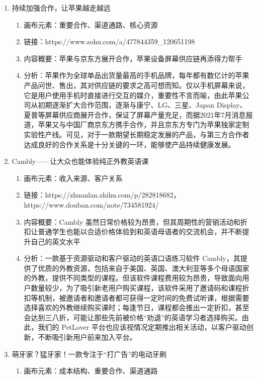 \documentclass[a4paper]{ctexart}
\begin{document}
\begin{enumerate}[label=\alph*.]
\begin{enumerate}[label=\alph*.]
  \end{enumerate}
  \item 持续加强合作，让苹果越走越远
  \begin{enumerate}[label=\alph*.]
    \item 画布元素：重要合作、渠道通路、核心资源
    \item 链接：https://www.sohu.com/a/477844359\_120651198
    \item 内容概要：苹果与京东方展开合作，苹果设备屏幕供应链再添得力帮手
    \item 分析：苹果作为全球单品出货量最高的手机品牌，每年都有数亿计的苹果产品问世、售出，其对供应链的要求之高可想而知。仅以手机屏幕来说，它是用户使用手机时直接进行交互的媒介，重要性不言而喻，由此苹果公司从初期逐渐扩大合作范围，逐渐与康宁、LG、三星、Japan Display、夏普等屏幕供应商展开合作，保证了屏幕产量充足，而据2021年7月消息报道，苹果又与中国厂商京东方携手合作，并且京东方专门为苹果独家定制实验性产线。可见，对于一款期望长期稳定发展的产品，与第三方合作者达成良好的合作关系是十分关键的一环，能够使产品持续健康发展。
  \end{enumerate}
  \item Cambly——让大众也能体验纯正外教英语课
  \begin{enumerate}[label=\alph*.]
    \item 画布元素：收入来源、客户关系
    \item 链接：https://zhuanlan.zhihu.com/p/282818682，https://www.douban.com/note/734581924/
    \item 内容概要：Cambly 虽然日常价格较为昂贵，但其周期性的营销活动和折扣让普通学生也能以合适价格体验到和英语母语者的交流机会，并不断提升自己的英文水平
    \item 分析：一款基于资源驱动和客户驱动的英语口语练习软件 Cambly，其提供了优质的外教资源，包括来自于美国、英国、澳大利亚等多个母语国家的外教，提供不同类型的课程。但该软件课程费用较为昂贵，导致面向用户数量较少，为了吸引新老用户购买课程，该软件采用了邀请码和课程折扣等机制，被邀请者和邀请者都可获得一定时间的免费试听课，根据需要选择喜欢的外教继续购买课时；每逢节日，课程都会推出一定折扣，甚至会达到三八折，可能让那些先前被价格“劝退”的英语学习者选择购买。由此，我们的 PetLover 平台也应该视情况定期推出相关活动，以客户驱动创新，不断吸引新用户前来加入平台。
  \end{enumerate}
  \item 萌牙家？猛牙家！一款专注于“打广告”的电动牙刷
  \begin{enumerate}[label=\alph*.]
    \item 画布元素：成本结构、重要合作、渠道通路

\end{enumerate}
\end{enumerate}
\end{document}
